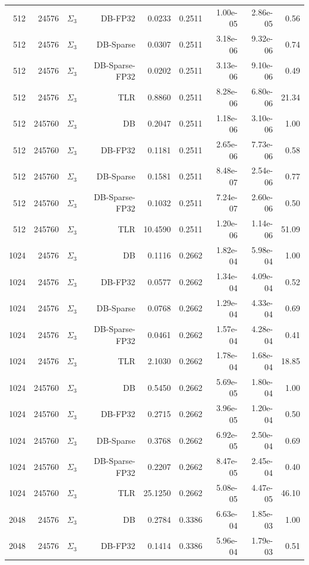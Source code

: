 \begin{tabular}{|r|r|r|r|r|r|r|r|r|}
  512 & 24576 & $\Sigma_3$ & DB-FP32 & 0.0233 & 0.2511 & 1.00e-05 & 2.86e-05 & 0.56 \\
  512 & 24576 & $\Sigma_3$ & DB-Sparse & 0.0307 & 0.2511 & 3.18e-06 & 9.32e-06 & 0.74 \\
  512 & 24576 & $\Sigma_3$ & DB-Sparse-FP32 & 0.0202 & 0.2511 & 3.13e-06 & 9.10e-06 & 0.49 \\
  512 & 24576 & $\Sigma_3$ & TLR & 0.8860 & 0.2511 & 8.28e-06 & 6.80e-06 & 21.34 \\
  512 & 245760 & $\Sigma_3$ & DB & 0.2047 & 0.2511 & 1.18e-06 & 3.10e-06 & 1.00 \\
  512 & 245760 & $\Sigma_3$ & DB-FP32 & 0.1181 & 0.2511 & 2.65e-06 & 7.73e-06 & 0.58 \\
  512 & 245760 & $\Sigma_3$ & DB-Sparse & 0.1581 & 0.2511 & 8.48e-07 & 2.54e-06 & 0.77 \\
  512 & 245760 & $\Sigma_3$ & DB-Sparse-FP32 & 0.1032 & 0.2511 & 7.24e-07 & 2.60e-06 & 0.50 \\
  512 & 245760 & $\Sigma_3$ & TLR & 10.4590 & 0.2511 & 1.20e-06 & 1.14e-06 & 51.09 \\
  1024 & 24576 & $\Sigma_3$ & DB & 0.1116 & 0.2662 & 1.82e-04 & 5.98e-04 & 1.00 \\
  1024 & 24576 & $\Sigma_3$ & DB-FP32 & 0.0577 & 0.2662 & 1.34e-04 & 4.09e-04 & 0.52 \\
  1024 & 24576 & $\Sigma_3$ & DB-Sparse & 0.0768 & 0.2662 & 1.29e-04 & 4.33e-04 & 0.69 \\
  1024 & 24576 & $\Sigma_3$ & DB-Sparse-FP32 & 0.0461 & 0.2662 & 1.57e-04 & 4.28e-04 & 0.41 \\
  1024 & 24576 & $\Sigma_3$ & TLR & 2.1030 & 0.2662 & 1.78e-04 & 1.68e-04 & 18.85 \\
  1024 & 245760 & $\Sigma_3$ & DB & 0.5450 & 0.2662 & 5.69e-05 & 1.80e-04 & 1.00 \\
  1024 & 245760 & $\Sigma_3$ & DB-FP32 & 0.2715 & 0.2662 & 3.96e-05 & 1.20e-04 & 0.50 \\
  1024 & 245760 & $\Sigma_3$ & DB-Sparse & 0.3768 & 0.2662 & 6.92e-05 & 2.50e-04 & 0.69 \\
  1024 & 245760 & $\Sigma_3$ & DB-Sparse-FP32 & 0.2207 & 0.2662 & 8.47e-05 & 2.45e-04 & 0.40 \\
  1024 & 245760 & $\Sigma_3$ & TLR & 25.1250 & 0.2662 & 5.08e-05 & 4.47e-05 & 46.10 \\
  2048 & 24576 & $\Sigma_3$ & DB & 0.2784 & 0.3386 & 6.63e-04 & 1.85e-03 & 1.00 \\
  2048 & 24576 & $\Sigma_3$ & DB-FP32 & 0.1414 & 0.3386 & 5.96e-04 & 1.79e-03 & 0.51 \\

\end{tabular}

